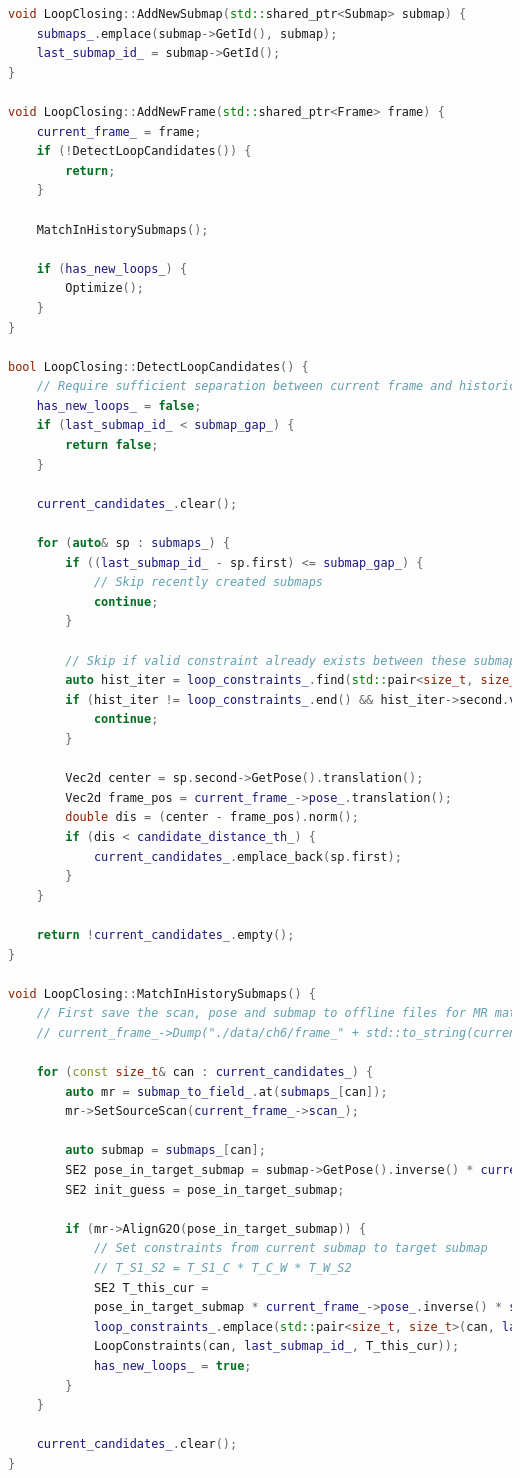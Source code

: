 \begin{lstlisting}[language=c++,caption=src/ch6/loop_closing.cc]
void LoopClosing::AddNewSubmap(std::shared_ptr<Submap> submap) {
	submaps_.emplace(submap->GetId(), submap);
	last_submap_id_ = submap->GetId();
}

void LoopClosing::AddNewFrame(std::shared_ptr<Frame> frame) {
	current_frame_ = frame;
	if (!DetectLoopCandidates()) {
		return;
	}
	
	MatchInHistorySubmaps();
	
	if (has_new_loops_) {
		Optimize();
	}
}

bool LoopClosing::DetectLoopCandidates() {
	// Require sufficient separation between current frame and historical submaps
	has_new_loops_ = false;
	if (last_submap_id_ < submap_gap_) {
		return false;
	}
	
	current_candidates_.clear();
	
	for (auto& sp : submaps_) {
		if ((last_submap_id_ - sp.first) <= submap_gap_) {
			// Skip recently created submaps
			continue;
		}
		
		// Skip if valid constraint already exists between these submaps
		auto hist_iter = loop_constraints_.find(std::pair<size_t, size_t>(sp.first, last_submap_id_));
		if (hist_iter != loop_constraints_.end() && hist_iter->second.valid_) {
			continue;
		}
		
		Vec2d center = sp.second->GetPose().translation();
		Vec2d frame_pos = current_frame_->pose_.translation();
		double dis = (center - frame_pos).norm();
		if (dis < candidate_distance_th_) {
			current_candidates_.emplace_back(sp.first);
		}
	}
	
	return !current_candidates_.empty();
}

void LoopClosing::MatchInHistorySubmaps() {
	// First save the scan, pose and submap to offline files for MR matching
	// current_frame_->Dump("./data/ch6/frame_" + std::to_string(current_frame_->id_) + ".txt");
	
	for (const size_t& can : current_candidates_) {
		auto mr = submap_to_field_.at(submaps_[can]);
		mr->SetSourceScan(current_frame_->scan_);
		
		auto submap = submaps_[can];
		SE2 pose_in_target_submap = submap->GetPose().inverse() * current_frame_->pose_;  // T_S1_C
		SE2 init_guess = pose_in_target_submap;
		
		if (mr->AlignG2O(pose_in_target_submap)) {
			// Set constraints from current submap to target submap
			// T_S1_S2 = T_S1_C * T_C_W * T_W_S2
			SE2 T_this_cur =
			pose_in_target_submap * current_frame_->pose_.inverse() * submaps_[last_submap_id_]->GetPose();
			loop_constraints_.emplace(std::pair<size_t, size_t>(can, last_submap_id_),
			LoopConstraints(can, last_submap_id_, T_this_cur));
			has_new_loops_ = true;
		}
	}
	
	current_candidates_.clear();
}
\end{lstlisting}

